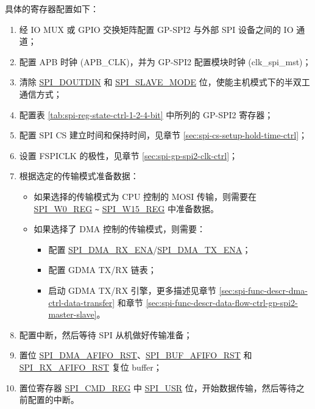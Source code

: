\documentclass[main\_\_CN.tex]{subfiles}
\begin{document}
具体的寄存器配置如下：
\begin{enumerate}
    \item 经 IO MUX 或 GPIO 交换矩阵配置 GP-SPI2 与外部 SPI 设备之间的 IO 通道；
    \item 配置 APB 时钟 (APB\_CLK)，并为 GP-SPI2 配置模块时钟 (clk\_spi\_mst)；

    \item 清除 \hyperref[fielddesc:SPIDOUTDIN]{SPI\_DOUTDIN} 和 \hyperref[fielddesc:SPISLAVEMODE]{SPI\_SLAVE\_MODE} 位，使能主机模式下的半双工通信方式；

    \item 配置表 \ref{tab:spi-reg-state-ctrl-1-2-4-bit} 中所列的 GP-SPI2 寄存器；

    \item 配置 SPI CS 建立时间和保持时间，见章节  \ref{sec:spi-cs-setup-hold-time-ctrl}；

    \item 设置 FSPICLK 的极性，见章节  \ref{sec:spi-gp-spi2-clk-ctrl}；

    \item 根据选定的传输模式准备数据：
    \begin{itemize}
        \item 如果选择的传输模式为 CPU 控制的 MOSI 传输，则需要在 \hyperref[regdesc:SPIW0REG]{SPI\_W0\_REG} \verb+~+ \hyperref[regdesc:SPIW15REG]{SPI\_W15\_REG} 中准备数据。

        \item 如果选择了 DMA 控制的传输模式，则需要：
        \begin{itemize}
            \item 配置 \hyperref[fielddesc:SPIDMARXENA]{SPI\_DMA\_RX\_ENA}/\hyperref[fielddesc:SPIDMATXENA]{SPI\_DMA\_TX\_ENA}；
            \item 配置 GDMA TX/RX 链表；
            \item 启动 GDMA TX/RX 引擎，更多描述见章节  \ref{sec:spi-func-descr-dma-ctrl-data-transfer} 和章节  \ref{sec:spi-func-descr-data-flow-ctrl-gp-spi2-master-slave}。
        \end{itemize}
    \end{itemize}

    \item 配置中断，然后等待 SPI 从机做好传输准备；

    \item 置位 \hyperref[fielddesc:SPIDMAAFIFORST]{SPI\_DMA\_AFIFO\_RST}、\hyperref[fielddesc:SPIBUFAFIFORST]{SPI\_BUF\_AFIFO\_RST} 和 \hyperref[fielddesc:SPIRXAFIFORST]{SPI\_RX\_AFIFO\_RST} 复位 buffer；

    \item 置位寄存器 \hyperref[regdesc:SPICMDREG]{SPI\_CMD\_REG} 中 \hyperref[fielddesc:SPIUSR]{SPI\_USR} 位，开始数据传输，然后等待之前配置的中断。
\end{enumerate}
\end{document}

